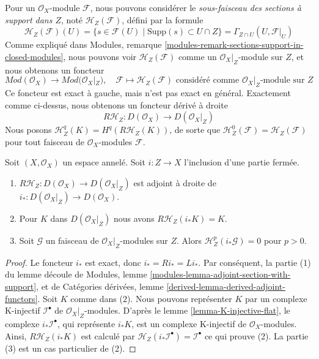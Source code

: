 {\medskip\noindent
Pour un $\mathcal{O}_X$-module $\mathcal{F}$, nous pouvons considérer le {\it sous-faisceau des sections à support dans $Z$}, noté $\mathcal{H}_Z(\mathcal{F})$, défini par la formule $$
\mathcal{H}_Z(\mathcal{F})(U) =
\{s \in \mathcal{F}(U) \mid \text{Supp}(s) \subset U \cap Z\} =
\Gamma_{Z \cap U}(U, \mathcal{F}|_U)
$$ Comme expliqué dans Modules, remarque \ref{modules-remark-sections-support-in-closed-modules}, nous pouvons voir $\mathcal{H}_Z(\mathcal{F})$ comme un $\mathcal{O}_X|_Z$-module sur $Z$, et nous obtenons un foncteur $$
\textit{Mod}(\mathcal{O}_X) \longrightarrow \textit{Mod}(\mathcal{O}_X|_Z),
\quad
\mathcal{F} \longmapsto \mathcal{H}_Z(\mathcal{F})
\text{ considéré comme }\mathcal{O}_X|_Z\text{-module sur }Z
$$ Ce foncteur est exact à gauche, mais n'est pas exact en général. Exactement comme ci-dessus, nous obtenons un foncteur dérivé à droite $$
R\mathcal{H}_Z : D(\mathcal{O}_X) \longrightarrow D(\mathcal{O}_X|_Z)
$$ Nous posons $\mathcal{H}^q_Z(K) = H^q(R\mathcal{H}_Z(K))$, de sorte que $\mathcal{H}^0_Z(\mathcal{F}) = \mathcal{H}_Z(\mathcal{F})$ pour tout faisceau de $\mathcal{O}_X$-modules $\mathcal{F}$.

\begin{lemma}

\label{lemma-cohomology-with-support-sheaf-on-support}
Soit $(X, \mathcal{O}_X)$ un espace annelé. Soit $i : Z \to X$ l'inclusion d'une partie fermée.
\begin{enumerate}
\item $R\mathcal{H}_Z : D(\mathcal{O}_X) \to D(\mathcal{O}_X|_Z)$ est adjoint à droite de $i_* : D(\mathcal{O}_X|_Z) \to D(\mathcal{O}_X)$.
\item Pour $K$ dans $D(\mathcal{O}_X|_Z)$ nous avons $R\mathcal{H}_Z(i_*K) = K$.
\item Soit $\mathcal{G}$ un faisceau de $\mathcal{O}_X|_Z$-modules sur $Z$. Alors $\mathcal{H}^p_Z(i_*\mathcal{G}) = 0$ pour $p > 0$.
\end{enumerate}

\end{lemma}

\begin{proof}

Le foncteur $i_*$ est exact, donc $i_* = Ri_* = Li_*$. Par conséquent, la partie (1) du lemme découle de Modules, lemme \ref{modules-lemma-adjoint-section-with-support},
et de Catégories dérivées, lemme \ref{derived-lemma-derived-adjoint-functors}. Soit $K$ comme dans (2). Nous pouvons représenter $K$ par un complexe K-injectif
$\mathcal{I}^\bullet$ de $\mathcal{O}_X|_Z$-modules. D'après le lemme \ref{lemma-K-injective-flat},
le complexe $i_*\mathcal{I}^\bullet$, qui représente $i_*K$, est un complexe K-injectif de $\mathcal{O}_X$-modules. Ainsi,
$R\mathcal{H}_Z(i_*K)$ est calculé par
$\mathcal{H}_Z(i_*\mathcal{I}^\bullet) = \mathcal{I}^\bullet$
ce qui prouve (2). La partie (3) est un cas particulier de (2).


\end{proof}}
